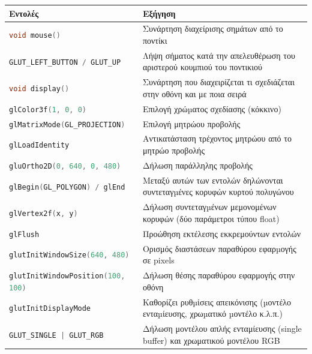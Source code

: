 \begin{center}
    \begin{longtable}{p{6.5cm}|p{7cm}} 
        \textbf{Εντολές} & \textbf{Εξήγηση} \\ \hline \hline
        \textlatin{\lstinline[language=C]!void mouse()!} & Συνάρτηση διαχείρισης σημάτων από το ποντίκι \\ \hline
        \textlatin{\lstinline[language=C]!GLUT_LEFT_BUTTON / GLUT_UP!} & Λήψη σήματος κατά την απελευθέρωση του αριστερού κουμπιού του ποντικιού \\ \hline
        \textlatin{\lstinline[language=C]!void display()!} & Συνάρτηση που διαχειρίζεται τι σχεδιάζεται στην οθόνη και με ποια σειρά \\ \hline
        \textlatin{\lstinline[language=C]!glColor3f(1, 0, 0)!} & Επιλογή χρώµατος σχεδίασης (κόκκινο) \\ \hline
        \textlatin{\lstinline[language=C]!glMatrixMode(GL_PROJECTION)!}  & Επιλογή μητρώου προβολής \\ \hline
        \textlatin{\lstinline[language=C]!glLoadIdentity!} & Αντικατάσταση τρέχοντος μητρώου από το μητρώο προβολής \\ \hline
        \textlatin{\lstinline[language=C]!gluOrtho2D(0, 640, 0, 480)!} & Δήλωση παράλληλης προβολής \\
        \hline
        \textlatin{\lstinline[language=C]!glBegin(GL_POLYGON) / glEnd!} & Μεταξύ αυτών των εντολών δηλώνονται συντεταγµένες κορυφών κυρτού πολυγώνου \\ \hline
        \textlatin{\lstinline[language=C]!glVertex2f(x, y)!} & Δήλωση συντεταγµένων μεμονομένων κορυφών (δύο παράμετροι τύπου \textlatin{float}) \\ \hline
        \textlatin{\lstinline[language=C]!glFlush!} & Προώθηση εκτέλεσης εκκρεμούντων εντολών \\ \hline
        \textlatin{\lstinline[language=C]!glutInitWindowSize(640, 480)!} & Ορισμός διαστάσεων παραθύρου εφαρµογής σε \textlatin{pixels} \\ \hline
        \textlatin{\lstinline[language=C]!glutInitWindowPosition(100, 100)!} & Δήλωση θέσης παραθύρου εφαρμογής στην οθόνη \\ \hline
        \textlatin{\lstinline[language=C]!glutInitDisplayMode!} & Καθορίζει ρυθµίσεις απεικόνισης (µοντέλο ενταµίευσης, χρωµατικό µοντέλο κ.λ.π.) \\ \hline
        \textlatin{\lstinline[language=C]!GLUT_SINGLE | GLUT_RGB!} & Δήλωση μοντέλου απλής ενταμίευσης (\textlatin{single buffer}) και χρωματικού μοντέλου \textlatin{RGB} \\ \hline

\end{longtable}
\end{center}
